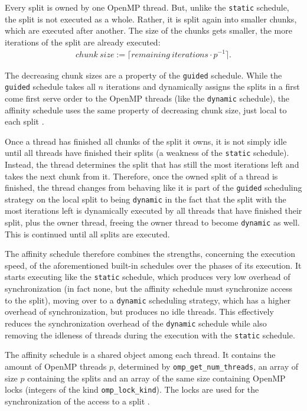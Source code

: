 \documentclass[twoside,11pt]{article}
\begin{document}
Every split is owned by one OpenMP thread. But, unlike the
\texttt{static} schedule, the split is not executed as a
whole.
Rather, it is split again into smaller chunks, which are
executed after another.
The size of the chunks gets smaller, the more iterations
of the split are already executed:
\begin{align*}
  chunk\ size := \lceil remaining\ iterations \cdot p^{-1} \rceil.
\end{align*}

The decreasing chunk sizes are a property of the
\texttt{guided} schedule.
While the \texttt{guided} schedule takes all $n$ iterations
and dynamically assigns the splits in a first come first
serve order to the OpenMP threads (like the
\texttt{dynamic} schedule), the affinity schedule
uses the same property of decreasing chunk size, just local
to each split \citep[see][Chapter 2]{omp}.

Once a thread has finished all chunks of the split it owns,
it is not simply idle until all threads have finished their
splits (a weakness of the \texttt{static} schedule).
Instead, the thread determines the split that has still the
most iterations left and takes the next chunk from it.
Therefore, once the owned split of a thread is finished,
the thread changes from behaving like it is part of the
\texttt{guided} scheduling strategy on the local split to
being \texttt{dynamic} in the fact that the split with the
most iterations left is dynamically executed by all threads
that have finished their split, plus the owner thread,
freeing the owner thread to become \texttt{dynamic} as
well.
This is continued until all splits are executed.

The affinity schedule therefore combines the strengths,
concerning the execution speed, of the aforementioned
built-in schedules over the phases of its execution.
It starts executing like the \texttt{static} schedule,
which produces very low overhead of synchronization (in
fact none, but the affinity schedule must synchronize
access to the split), moving over to a \texttt{dynamic}
scheduling strategy,
which has a higher overhead of synchronization, but
produces no idle threads.
This effectively reduces the synchronization overhead of
the \texttt{dynamic} schedule while also removing the
idleness of threads during the execution with the
\texttt{static} schedule.

The affinity schedule is a shared object among each thread.
It contains the amount of OpenMP threads $p$, determined
by \texttt{omp\_get\_num\_threads}, an array of size $p$
containing the splits and an array of the same size
containing OpenMP locks (integers of the kind
\texttt{omp\_lock\_kind}).
The locks are used for the synchronization of the access
to a split \citep[see][Chapter 3]{omp}.
\end{document}
